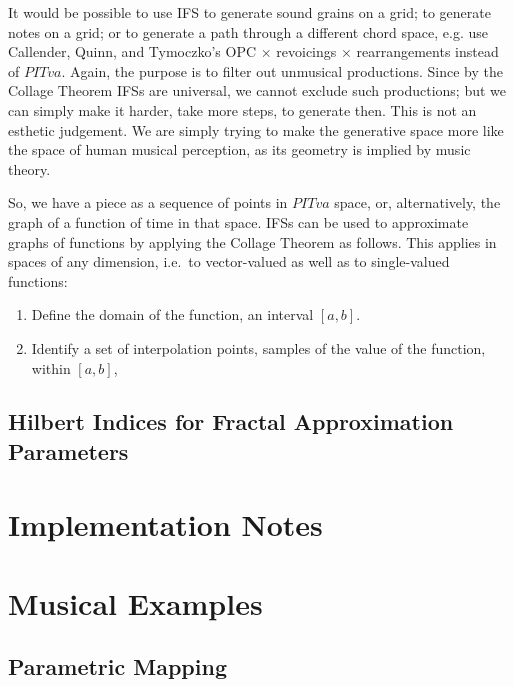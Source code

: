 \documentclass[english,11pt,letterpaper,onecolumn]{scrartcl}
\begin{document}
It would be possible to use IFS to generate sound grains on a grid; to 
generate notes on a grid; or to generate a path through a different chord 
space, e.g. use Callender, Quinn, and Tymoczko's OPC $\times$ revoicings 
$\times$ rearrangements instead of $PITva$. Again, the purpose is to filter 
out unmusical productions. Since by the Collage Theorem IFSs are universal, we 
cannot exclude such productions; but we can simply make it harder, take more 
steps, to generate then. This is not an esthetic judgement. We are 
simply trying to make the generative space more like the space of human 
musical perception, as its geometry is implied by music theory.

So, we have a piece as a sequence of points in $PITva$ space, or, 
alternatively, the graph of a function of time in that space. IFSs can 
be used to approximate graphs of functions by applying the Collage Theorem 
as follows. This applies in spaces of any dimension, i.e.\ to vector-valued as 
well as to single-valued functions:

\begin{enumerate}
 \item Define the domain of the function, an interval $[a, b]$.
 \item Identify a set of interpolation points, samples of the value of the 
function, within $[a, b]$, 
\end{enumerate}










\subsection{Hilbert Indices for Fractal Approximation Parameters}

\section{Implementation Notes}

\section{Musical Examples}

\subsection{Parametric Mapping}
\end{document}
